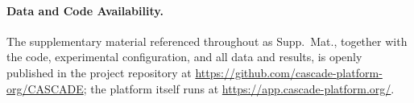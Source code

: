 \documentclass{svproc}
\begin{document}
\paragraph{Data and Code Availability.} The supplementary material referenced
throughout as Supp.~Mat., together with the code, experimental configuration, and
all data and results, is openly published in the project repository at
\url{https://github.com/cascade-platform-org/CASCADE}; the platform itself runs at
\url{https://app.cascade-platform.org/}.



\end{document}
